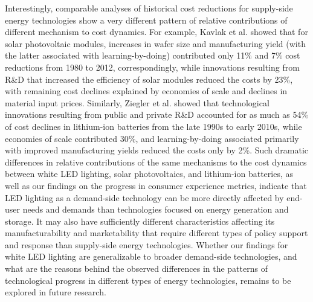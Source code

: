 \documentclass[parskip=full]{article}
\begin{document}
Interestingly, comparable analyses of historical cost reductions for supply-side energy technologies show a very different pattern of relative contributions of different mechanism to cost dynamics. For example, Kavlak et al.\cite{kavlak2018evaluating} showed that for solar photovoltaic modules, increases in wafer size and manufacturing yield (with the latter associated with learning-by-doing) contributed only 11\% and 7\% cost reductions from 1980 to 2012, correspondingly, while innovations resulting from R\&D that increased the efficiency of solar modules reduced the costs by 23\%, with remaining cost declines explained by economies of scale and declines in material input prices. Similarly, Ziegler et al.\cite{Ziegler2021} showed that technological innovations resulting from public and private R\&D accounted for as much as 54\% of cost declines in lithium-ion batteries from the late 1990s to early 2010s, while economies of scale contributed 30\%, and learning-by-doing associated primarily with improved manufacturing yields reduced the costs only by 2\%. Such dramatic differences in relative contributions of the same mechanisms to the cost dynamics between white LED lighting, solar photovoltaics, and lithium-ion batteries, as well as our findings on the progress in consumer experience metrics, indicate that LED lighting as a demand-side technology can be more directly affected by end-user needs and demands than technologies focused on energy generation and storage. It may also have sufficiently different characteristics affecting its manufacturability and marketability that require different types of policy support and response than supply-side energy technologies. Whether our findings for white LED lighting are generalizable to broader demand-side technologies, and what are the reasons behind the observed differences in the patterns of technological progress in different types of energy technologies, remains to be explored in future research. 
\end{document}
